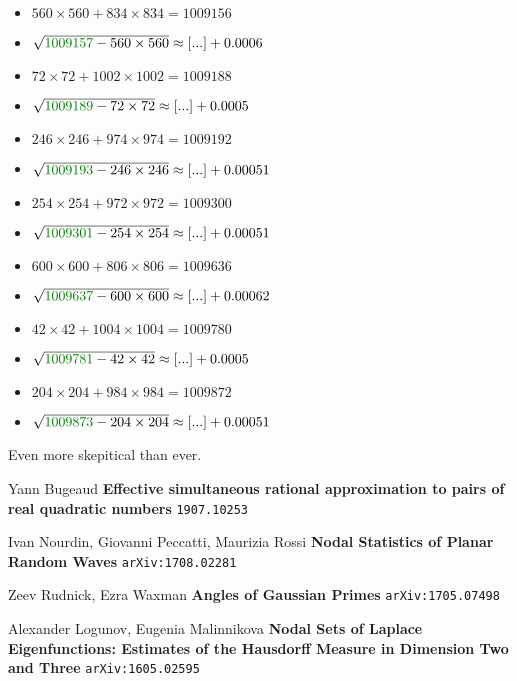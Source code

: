\documentclass[12pt]{article}
\begin{document}
\begin{multicols}{2}
\begin{itemize}
\item $560\times560 + 834\times834 = 1009156$
\item $\sqrt{ {\color{green!50!black}{1009157}} - 560\times 560 } \approx [...] + 0.0006$
\item $72\times72 + 1002\times1002 = 1009188$
\item $\sqrt{ {\color{green!50!black}{1009189}} - 72\times 72 } \approx [...] + 0.0005$
\item $246\times246 + 974\times974 = 1009192$
\item $\sqrt{ {\color{green!50!black}{1009193}} - 246\times 246 } \approx [...] + 0.00051$
\item $254\times254 + 972\times972 = 1009300$
\item $\sqrt{ {\color{green!50!black}{1009301}} - 254\times 254 } \approx [...] + 0.00051$
\item $600\times600 + 806\times806 = 1009636$
\item $\sqrt{ {\color{green!50!black}{1009637}} - 600\times 600 } \approx [...] + 0.00062$
\item $42\times42 + 1004\times1004 = 1009780$
\item $\sqrt{ {\color{green!50!black}{1009781}} - 42\times 42 } \approx [...] + 0.0005$
\item $204\times204 + 984\times984 = 1009872$
\item $\sqrt{ {\color{green!50!black}{1009873}} - 204\times 204 } \approx [...] + 0.00051$
\end{itemize}
\end{multicols}
Even more skepitical than ever.
\vfill



\begin{thebibliography}{}

\item Yann Bugeaud {\textbf{Effective simultaneous rational approximation to pairs of real quadratic numbers}} \texttt{1907.10253}
\item Ivan Nourdin, Giovanni Peccatti, Maurizia Rossi \textbf{Nodal Statistics of Planar Random Waves} \texttt{arXiv:1708.02281}
\item Zeev Rudnick, Ezra Waxman \textbf{Angles of Gaussian Primes} \texttt{arXiv:1705.07498}
\item Alexander Logunov, Eugenia Malinnikova \textbf{Nodal Sets of Laplace Eigenfunctions: Estimates of the Hausdorff Measure in Dimension Two and Three} \texttt{arXiv:1605.02595}
\end{thebibliography} 
\end{document}
